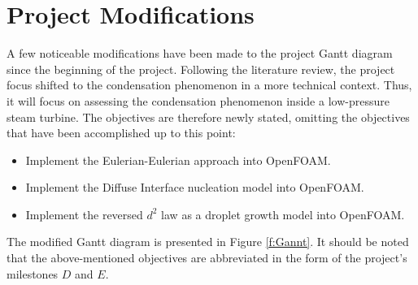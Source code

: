 \documentclass[12pt]{article}
\begin{document}
\section{Project Modifications}\label{s:modifications}
A few noticeable modifications have been made to the project Gantt diagram since the beginning of the project. Following the literature review, the project focus shifted to the condensation phenomenon in a more technical context. Thus, it will focus on assessing the condensation phenomenon inside a low-pressure steam turbine. The objectives are therefore newly stated, omitting the objectives that have been accomplished up to this point:
\begin{itemize}
    \item Implement the Eulerian-Eulerian approach into OpenFOAM.
    \item Implement the Diffuse Interface nucleation model into OpenFOAM.
    \item Implement the reversed $d^{2}$ law as a droplet growth model into OpenFOAM.
\end{itemize}
The modified Gantt diagram is presented in Figure \ref{f:Gannt}. It should be noted that the above-mentioned objectives are abbreviated in the form of the project's milestones $D$ and $E$.
\end{document}
